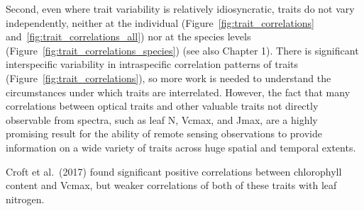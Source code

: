 Second, even where trait variability is relatively idiosyncratic, traits do not vary independently, neither at the individual (Figure~\ref{fig:trait_correlations} and~\ref{fig:trait_correlations_all}) nor at the species levels (Figure~\ref{fig:trait_correlations_species}) (see also Chapter 1).
There is significant interspecific variability in intraspecific correlation patterns of traits (Figure~\ref{fig:trait_correlations}), so more work is needed to understand the circumstances under which traits are interrelated.
% 
% 
However, the fact that many correlations between optical traits and other valuable traits not directly observable from spectra, such as leaf N, Vcmax, and Jmax, are a highly promising result for the ability of remote sensing observations to provide information on a wide variety of traits across huge spatial and temporal extents.

Croft et al.~(2017) \nocite{croft_2017_chlorophyll} found significant positive correlations between chlorophyll content and Vcmax, but weaker correlations of both of these traits with leaf nitrogen. %

